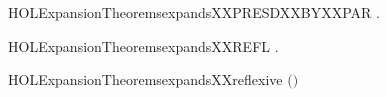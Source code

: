 \newcommand{\HOLExpansionTheoremsexpandsXXPRESDXXBYXXGUARDEDXXSUM}{\UseVerbatim{HOLExpansionTheoremsexpandsXXPRESDXXBYXXGUARDEDXXSUM}}
\begin{SaveVerbatim}{HOLExpansionTheoremsexpandsXXPRESDXXBYXXPAR}
\HOLTokenTurnstile{} \HOLSymConst{\HOLTokenForall{}}   .
          \HOLSymConst{\HOLTokenConj{}}    \HOLSymConst{\HOLTokenImp{}}
        \HOLSymConst{\ensuremath{\mid}}    \HOLSymConst{\ensuremath{\mid}} 
\end{SaveVerbatim}
\newcommand{\HOLExpansionTheoremsexpandsXXPRESDXXBYXXPAR}{\UseVerbatim{HOLExpansionTheoremsexpandsXXPRESDXXBYXXPAR}}
\begin{SaveVerbatim}{HOLExpansionTheoremsexpandsXXREFL}
\HOLTokenTurnstile{} \HOLSymConst{\HOLTokenForall{}}.   
\end{SaveVerbatim}
\newcommand{\HOLExpansionTheoremsexpandsXXREFL}{\UseVerbatim{HOLExpansionTheoremsexpandsXXREFL}}
\begin{SaveVerbatim}{HOLExpansionTheoremsexpandsXXreflexive}
\HOLTokenTurnstile{}  \ensuremath{(}\ensuremath{)}
\end{SaveVerbatim}
\newcommand{\HOLExpansionTheoremsexpandsXXreflexive}{\UseVerbatim{HOLExpansionTheoremsexpandsXXreflexive}}
